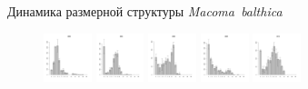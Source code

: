 \documentclass{beamer}
\begin{document}
\begin{frame}{Динамика размерной структуры {\it Macoma~balthica}}
\begin{figure}[h]
\includegraphics[width=14mm]{../White_Sea/Estuatiy_Luvenga/sizestr2_2000_.pdf}
\includegraphics[width=14mm]{../White_Sea/Estuatiy_Luvenga/sizestr2_2003_.pdf}
\includegraphics[width=14mm]{../White_Sea/Estuatiy_Luvenga/sizestr2_2006_.pdf}
\includegraphics[width=14mm]{../White_Sea/Estuatiy_Luvenga/sizestr2_2009_.pdf}
\includegraphics[width=14mm]{../White_Sea/Estuatiy_Luvenga/sizestr2_2012_.pdf}
\end{figure}
\end{frame}
\end{document}
